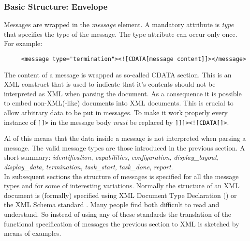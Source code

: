 \documentclass{article}
\begin{document}

   \subsubsection{Basic Structure: Envelope} \label{ss:structure}

    \noindent Messages are wrapped in the \textit{message} element. A mandatory
    attribute is \textit{type} that specifies the type of the message. The type
    attribute can occur only once. For example:
 
    \begin{verbatim}
     <message type="termination"><![CDATA[message content]]></message>\end{verbatim}

    The content of a message is wrapped as so-called CDATA section. This is an
    XML construct that is used to indicate that it's contents should not be
    interpreted as XML when parsing the document. As a consequence it is
    possible to embed non-XML(-like) documents into XML documents. This is crucial
    to allow arbitrary data to be put in messages. To make it work properly
    every instance of \verb']]>' in the message body \textit{must} be replaced by
    \verb']]]><![CDATA[]>'.
    
    Al of this means that the data inside a message is not interpreted when
    parsing a message.  The valid message types are those introduced in the
    previous section. A short summary: \textit{identification},
    \textit{capabilities}, \textit{configuration}, \textit{display\_layout},
    \textit{display\_data}, \textit{termination}, \textit{task\_start},
    \textit{task\_done}, \textit{report}.
    \\[5pt]
    \noindent In subsequent sections the structure of messages is specified for
    all the message types and for some of interesting variations. Normally the
    structure of an XML document is (formally) specified using XML Document
    Type Declaration (\cite{Sperberg-McQueen:06:EML}) or the XML Schema
    standard \cite{Malhotra:06:XSP}. Many people find both difficult to read
    and understand. So instead of using any of these standards the translation
    of the functional specification of messages the previous section to XML is
    sketched by means of examples.
\end{document}
